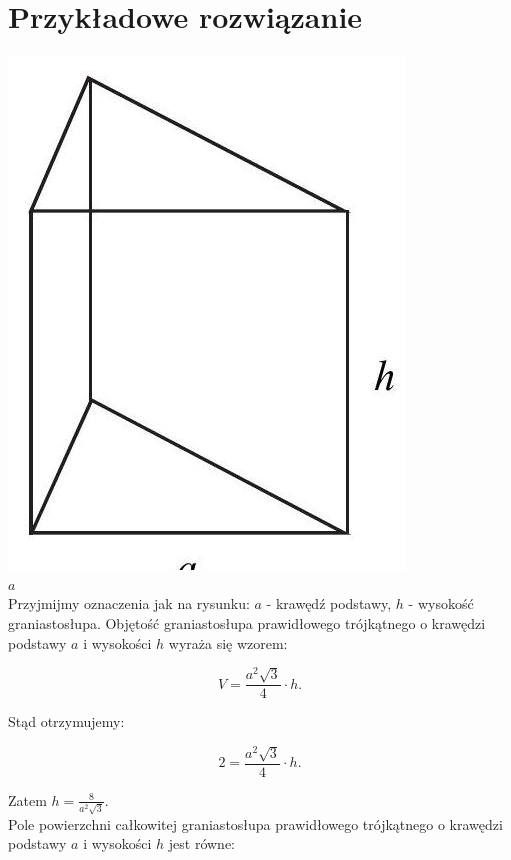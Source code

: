 \documentclass[10pt]{article}
\begin{document}
\section*{Przykładowe rozwiązanie}
\includegraphics[max width=\textwidth, center]{2025_02_07_d712b9a47aa2c64928dbg-50}\\
$a$\\
Przyjmijmy oznaczenia jak na rysunku: $a$ - krawędź podstawy, $h$ - wysokość graniastosłupa. Objętość graniastosłupa prawidłowego trójkątnego o krawędzi podstawy $a$ i wysokości $h$ wyraża się wzorem:

$$
V=\frac{a^{2} \sqrt{3}}{4} \cdot h .
$$

Stąd otrzymujemy:

$$
2=\frac{a^{2} \sqrt{3}}{4} \cdot h .
$$

Zatem $h=\frac{8}{a^{2} \sqrt{3}}$.\\
Pole powierzchni całkowitej graniastosłupa prawidłowego trójkątnego o krawędzi podstawy $a$ i wysokości $h$ jest równe:
\end{document}
